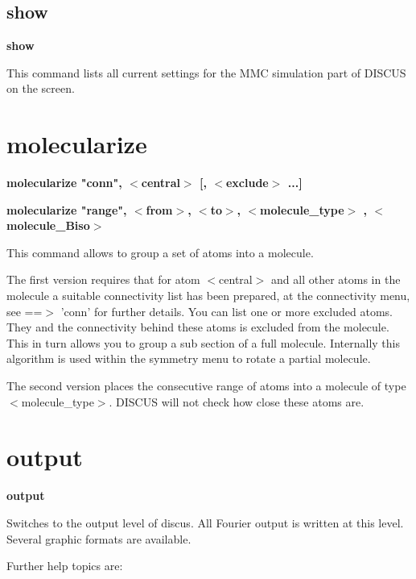 \subsection*{show}
{\bf show \par }
\par
\vspace{3pt}
This command lists all current settings for the MMC simulation part 
of DISCUS on the screen. 
\section{molecularize}
{\bf molecularize "conn", $ <$central$> $ [, $ <$exclude$> $ ...] \par }
{\bf molecularize "range", $ <$from$> $, $ <$to$> $, $ <$molecule\_type$> $ , $ <$molecule\_Biso$> $ \par }
\par
\vspace{3pt}
This command allows to group a set of atoms into a molecule. 
\par
The first version requires that for atom $ <$central$> $ and all other 
atoms in the molecule a suitable connectivity list has been prepared, 
at the connectivity menu, see ==$> $ 'conn' for further details. 
You can list  one or more excluded atoms. They and the connectivity 
behind these atoms is excluded from the molecule. This in turn 
allows you to group a sub section of a full molecule. 
Internally this algorithm is used within the symmetry menu to 
rotate a partial molecule. 
\par
The second version places the consecutive range of atoms into 
a molecule of type $ <$molecule\_type$> $. 
DISCUS will not check how close these atoms are. 
\section{output}
{\bf output \par }
\par
\vspace{3pt}
Switches to the output level of discus. All Fourier output is written 
at this level. Several graphic formats are available. 
\par
Further help topics are: 
\par
